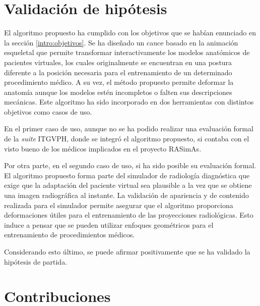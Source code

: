 \section{Validación de hipótesis}
\label{conclu:hipotesis}

El algoritmo propuesto ha cumplido con los objetivos que se habían enunciado en la sección \ref{intro:objetivos}. Se ha diseñado un cauce basado en la animación esqueletal que permite transformar interactivamente los modelos anatómicos de pacientes virtuales, los cuales originalmente se encuentran en una postura diferente a la posición necesaria para el entrenamiento de un determinado procedimiento médico. A su vez, el método propuesto permite deformar la anatomía aunque los modelos estén incompletos o falten sus descripciones mecánicas. Este algoritmo ha sido incorporado en dos herramientas con distintos objetivos como casos de uso.

En el primer caso de uso, aunque no se ha podido realizar una evaluación formal de la \emph{suite} \ac{ITGVPH}, donde se integró el algoritmo propuesto, si contaba con el visto bueno de los médicos implicados en el proyecto \ac{RASimAs}.

Por otra parte, en el segundo caso de uso, si ha sido posible su evaluación formal.
El algoritmo propuesto forma parte del simulador de radiología diagnóstica que exige que la adaptación del paciente virtual sea plausible a la vez que se obtiene una imagen radiográfica al instante.
La validación de apariencia y de contenido realizada para el simulador %
permite asegurar que el algoritmo proporciona deformaciones útiles para el entrenamiento de las proyecciones radiológicas.
Esto induce a pensar que se pueden utilizar enfoques geométricos para el entrenamiento de procedimientos médicos.

Considerando esto último, se puede afirmar positivamente que se ha validado la hipótesis de partida.




\section{Contribuciones}
